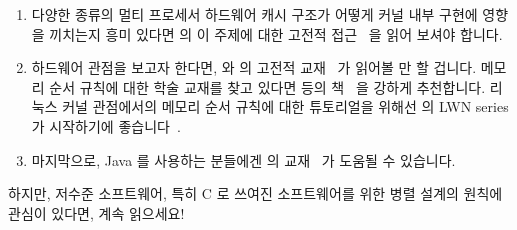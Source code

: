 \begin{enumerate}
\fi

\item	다양한 종류의 멀티 프로세서 하드웨어 캐시 구조가 어떻게 커널 내부
	구현에 영향을 끼치는지 흥미 있다면  의 이 주제에
	대한 고전적 접근~\cite{Schimmel:1994:USM:175689} 을 읽어 보셔야 합니다.
\item	하드웨어 관점을 보고자 한다면,  와
	 의 고전적
	교재~\cite{Hennessy2017,Hennessy2011} 가 읽어볼 만 할 겁니다.
	메모리 순서 규칙에 대한 학술 교재를 찾고 있다면
	 등의 책~\cite{DanielJSorin2011MemModel,%
	VijayNagarajan2020MemModel} 을 강하게 추천합니다.
	리눅스 커널 관점에서의 메모리 순서 규칙에 대한 튜토리얼을 위해선
	 의 LWN series 가 시작하기에
	좋습니다~\cite{PaoloBonzini2021lockless1,PaoloBonzini2021lockless2,PaoloBonzini2021lockless3,PaoloBonzini2021lockless4,PaoloBonzini2021lockless5}.
\item	마지막으로, Java 를 사용하는 분들에겐  의
	교재~\cite{DougLea1997Textbook,Goetz2007Textbook} 가 도움될 수
	있습니다.

\iffalse

\item	Those interested in learning how various types of multi-processor
	hardware
	cache organizations affect the implementation of kernel
	internals should take a look at \ppl{Curt}{Schimmel}'s classic
	treatment of this subject~\cite{Schimmel:1994:USM:175689}.
\item	If you are looking for a hardware view, \pplsur{John L.}{Hennessy}'s and
	\pplsur{David A.}{Patterson}'s classic
	textbook~\cite{Hennessy2017,Hennessy2011} is well worth a read.
	If you are looking for an academic textbook on memory ordering,
	that of \ppl{Daniel}{Sorin} et al.~\cite{DanielJSorin2011MemModel,%
	VijayNagarajan2020MemModel}
	is highly recommended.
	For a memory-ordering tutorial from a Linux-kernel viepwpoint,
	\ppl{Paolo}{Bonzini}'s LWN series is a good place to
	start~\cite{PaoloBonzini2021lockless1,PaoloBonzini2021lockless2,PaoloBonzini2021lockless3,PaoloBonzini2021lockless4,PaoloBonzini2021lockless5}.
\item	Finally, those using Java might be well-served by \ppl{Doug}{Lea}'s
	textbooks~\cite{DougLea1997Textbook,Goetz2007Textbook}.

\fi

\end{enumerate}

하지만, 저수준 소프트웨어, 특히 C 로 쓰여진 소프트웨어를 위한 병렬 설계의
원칙에 관심이 있다면, 계속 읽으세요!

